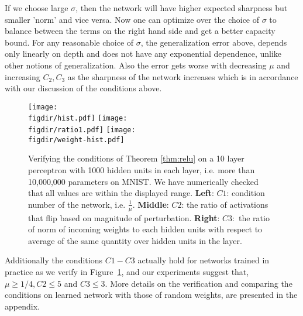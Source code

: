 \documentclass{article}
\newcommand{\figdir}{.}
\begin{document}
If we choose large $\sigma$, then the network will have higher expected sharpness but smaller 'norm' and vice versa. Now one can optimize over the choice of $\sigma$ to balance between the terms on the right hand side and get a better capacity bound. For any reasonable choice of $\sigma$, the generalization error above, depends only linearly on depth and does not have any exponential dependence, unlike other notions of generalization. Also the error gets worse with decreasing $\mu$ and increasing $C_2, C_3$ as the sharpness of the network increases which is in accordance with our discussion of the conditions above.




\begin{figure}[t]
\centering
\texttt{[image: \\figdir/hist.pdf]}
\texttt{[image: \\figdir/ratio1.pdf]}
\texttt{[image: \\figdir/weight-hist.pdf]}\\
\caption{\small Verifying the conditions of Theorem \ref{thm:relu} on a 10 layer perceptron with 1000 hidden units in each layer, i.e. more than 10,000,000 parameters on MNIST. We have numerically checked that all values are within the displayed range. \textbf{Left}: $C1$: condition number of the network, i.e. $\frac{1}{\mu}$. \textbf{Middle}:  $C2$: the ratio of activations that flip based on magnitude of perturbation. \textbf{Right}:  $C3:$ the ratio of norm of incoming weights to each hidden units with respect to average of the same quantity over hidden units in the layer.}
\label{fig:conditions_verify1}
\end{figure}

Additionally the conditions $C1-C3$ actually hold for networks trained in practice as we verify in Figure~\ref{fig:conditions_verify1}, and our experiments suggest that, $\mu \geq 1/4, C2 \leq 5$ and $C3 \leq 3$. More details on the verification and comparing the conditions on learned network with those of random weights, are presented in the appendix.
\end{document}
